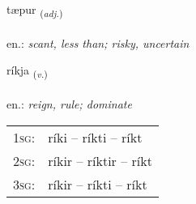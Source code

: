 \documentclass[frontgrid, backgrid]{flacards}\usepackage[]{graphicx}\usepackage[]{xcolor}
\begin{document}
\renewcommand{\flhead}{\vskip5pt \fboxsep=0pt {\small\bfseries\footnotesize Lýsingarorð | Adjective}}
\renewcommand{\fcfoot}{\vskip5pt \fboxsep=0pt \hspace{2pt}{\small\bfseries\footnotesize 2K}}

\renewcommand{\blhead}{\vskip5pt {\small\bfseries\footnotesize Lýsingarorð | Adjective }}
\renewcommand{\bcfoot}{\vskip5pt \hspace{2pt}{\small\bfseries\footnotesize 2K}}


{tæpur \small{\textsubscript{(\textit{adj.})}} \\[1ex] %
\textphonetic{[tʰaiːpʏr]} \\
en.: \emph{scant, less than; risky, uncertain} \\  [2ex]
\renewcommand*{\arraystretch}{0.8}
}

\renewcommand{\flhead}{\vskip5pt \fboxsep=0pt {\small\bfseries\footnotesize Sagnorð | Verb}}
\renewcommand{\fcfoot}{\vskip5pt \fboxsep=0pt \hspace{2pt}{\small\bfseries\footnotesize 2K}}

\renewcommand{\blhead}{\vskip5pt {\small\bfseries\footnotesize Sagnorð | Verb }}
\renewcommand{\bcfoot}{\vskip5pt \hspace{2pt}{\small\bfseries\footnotesize 2K}}


{ríkja \small{\textsubscript{(\textit{v.})}} \\[1ex] %
\textphonetic{[riːca]} \\
en.: \emph{reign, rule; dominate} \\  [2ex]
\renewcommand*{\arraystretch}{0.8}
\begin{tabular}{p{1cm}l}
\textsc{1sg}: & ríki -- ríkti -- ríkt \\ 
\textsc{2sg}: & ríkir -- ríktir -- ríkt \\ 
\textsc{3sg}: & ríkir -- ríkti -- ríkt \\ 
\end{tabular}
}
\end{document}
